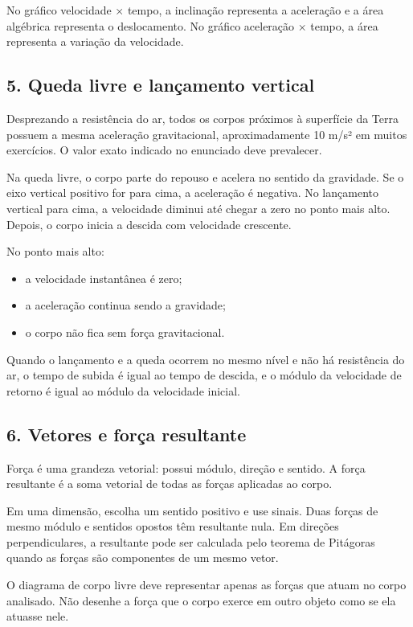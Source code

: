 \documentclass[11pt,a4paper]{article}
\begin{document}
No gráfico velocidade × tempo, a inclinação representa a aceleração e a área algébrica representa o deslocamento. No gráfico aceleração × tempo, a área representa a variação da velocidade.

\subsection*{5. Queda livre e lançamento vertical}

Desprezando a resistência do ar, todos os corpos próximos à superfície da Terra possuem a mesma aceleração gravitacional, aproximadamente 10 m/s² em muitos exercícios. O valor exato indicado no enunciado deve prevalecer.

Na queda livre, o corpo parte do repouso e acelera no sentido da gravidade. Se o eixo vertical positivo for para cima, a aceleração é negativa. No lançamento vertical para cima, a velocidade diminui até chegar a zero no ponto mais alto. Depois, o corpo inicia a descida com velocidade crescente.

No ponto mais alto:

\begin{itemize}
  \item a velocidade instantânea é zero;
  \item a aceleração continua sendo a gravidade;
  \item o corpo não fica sem força gravitacional.
\end{itemize}

Quando o lançamento e a queda ocorrem no mesmo nível e não há resistência do ar, o tempo de subida é igual ao tempo de descida, e o módulo da velocidade de retorno é igual ao módulo da velocidade inicial.

\subsection*{6. Vetores e força resultante}

Força é uma grandeza vetorial: possui módulo, direção e sentido. A força resultante é a soma vetorial de todas as forças aplicadas ao corpo.

Em uma dimensão, escolha um sentido positivo e use sinais. Duas forças de mesmo módulo e sentidos opostos têm resultante nula. Em direções perpendiculares, a resultante pode ser calculada pelo teorema de Pitágoras quando as forças são componentes de um mesmo vetor.

O diagrama de corpo livre deve representar apenas as forças que atuam no corpo analisado. Não desenhe a força que o corpo exerce em outro objeto como se ela atuasse nele.
\end{document}
